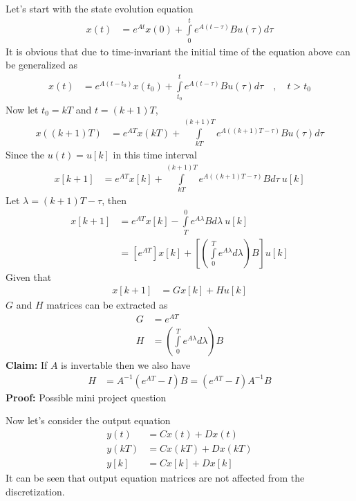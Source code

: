 \documentclass[twoside]{article}
\begin{document}
Let's start with the state evolution equation
%
\begin{align*}
  x(t) &= e^{A t} x(0) + \int\limits_{0}^{t} e^{A ( t - \tau ) } B
         u(\tau) d \tau
\end{align*}
%
It is obvious that due to time-invariant the initial time of the 
equation above can be generalized as
%
\begin{align*}
  x(t) &= e^{A (t - t_0)} x(t_0) + \int\limits_{t_0}^{t} e^{A ( t - \tau ) } B
         u(\tau) d \tau \quad , \quad t > t_0
\end{align*}
%
Now let $t_0 = k T$ and $t = (k+1) T$,
%
\begin{align*}
  x( (k+1) T ) &= e^{A T} x(k T) + \int\limits_{kT}^{(k+1)T} e^{A ( (k+1)T - \tau ) } B
         u(\tau) d \tau 
\end{align*}
%
Since the $u(t) = u[k]$ in this time interval
%
\begin{align*}
  x[k+1] &= e^{A T} x[k] + \int\limits_{kT}^{(k+1)T} e^{A ( (k+1)T -
           \tau ) } B d \tau \ u[k]
\end{align*}
%
Let $\lambda = (k+1)T -\tau $, then
%
\begin{align*}
  x[k+1] &= e^{A T} x[k] - \int\limits_{T}^{0} e^{A \lambda } B d \lambda \ u[k]
\\
&= \left[ e^{A T} \right] x[k] + \left[\left( \int\limits_{0}^{T}
  e^{A \lambda } d \lambda \right) B \right] u[k]
\end{align*}
% 
Given that 
%
\begin{align*}
  x[k+1] &= G x[k] + H u[k]
\end{align*}
%
$G$ and $H$ matrices can be extracted as
%
\begin{align*}
  G &= e^{A T}
\\
 H &= \left( \int\limits_{0}^{T}
  e^{A \lambda } d \lambda \right) B
\end{align*}
%
\textbf{Claim:} If $A$ is invertable then we also have
%
\begin{align*}
 H &= A^{-1} \left( e^{AT} - I \right) B = \left( e^{AT} - I \right)
     A^{-1}  B  
\end{align*}
%
\textbf{Proof:} Possible mini project question

Now let's consider the output equation
%
%
\begin{align*}
  y(t) &= C x(t) + D x(t)
         \\
 y(k T) &= C x( k T) + D x( k T) 
\\
 y[k] &= C x[k] + D x[k] 
\end{align*}
%
It can be seen that output equation matrices are not affected from
the discretization.
\end{document}
